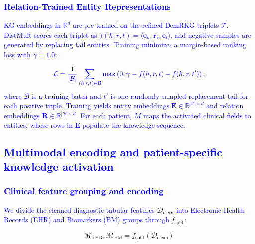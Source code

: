\documentclass[lettersize,journal]{IEEEtran}
\begin{document}
\subsubsection{\textcolor{blue}{Relation-Trained Entity Representations}}

    \textcolor{blue}{KG embeddings in $\mathbb{R}^d$ are pre-trained on the refined DemRKG triplets $\mathcal{T}$. DistMult scores each triplet as $f(h,r,t)=\langle\mathbf e_h,\mathbf r_r,\mathbf e_t\rangle$, and negative samples are generated by replacing tail entities. Training minimizes a margin-based ranking loss with $\gamma=1.0$:}

    \begin{equation}
        {\color{blue}
        \mathcal{L} = \frac{1}{|\mathcal{B}|}\sum_{(h,r,t)\in\mathcal{B}}
        \max\left(0,\gamma-f(h,r,t)+f(h,r,t')\right),
        }
        \label{eq:margin_loss}
    \end{equation}
    \textcolor{blue}{where $\mathcal{B}$ is a training batch and $t'$ is one randomly sampled replacement tail for each positive triple.}
    \textcolor{blue}{Training yields entity embeddings $\mathbf{E} \in \mathbb{R}^{|\mathcal{V}| \times d}$ and relation embeddings $\mathbf{R} \in \mathbb{R}^{|\mathcal{R}| \times d}$.}
    \textcolor{blue}{For each patient, $M$ maps the activated clinical fields to entities, whose rows in $\mathbf E$ populate the knowledge sequence.}


\subsection{\textcolor{blue}{Multimodal encoding and patient-specific knowledge activation}}

    \subsubsection{\textcolor{blue}{Clinical feature grouping and encoding}}

    \textcolor{blue}{We divide the cleaned diagnostic tabular features} $\mathcal{D}_{\mathrm{clean}}$ \textcolor{blue}{into Electronic Health Records (EHR) and Biomarkers (BM) groups through} $f_{\mathrm{split}}$:


    \begin{equation}
        \mathcal{M}_{\mathrm{EHR}}, \mathcal{M}_{\mathrm{BM}} = f_{\mathrm{split}}(\mathcal{D}_{\mathrm{clean}})
        \label{eq:modality_split}
    \end{equation}
\end{document}
